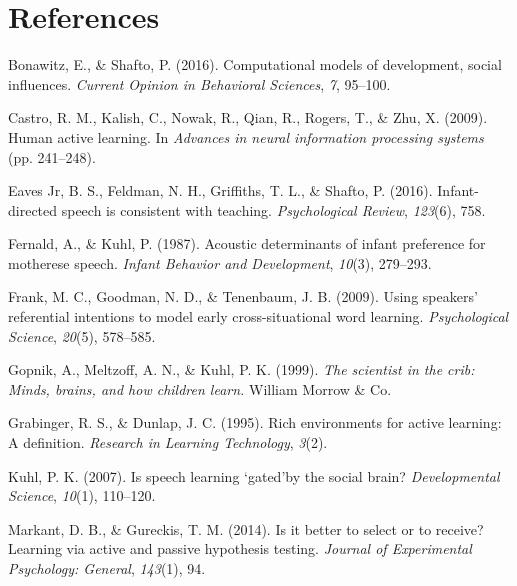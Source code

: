 \documentclass[a4paper,man,apacite,floatsintext]{apa6}
\begin{document}
\newpage

\section{References}\label{references}

\setlength{\parindent}{-0.4in} \setlength{\leftskip}{0.125in} \noindent

\hypertarget{refs}{}
\hypertarget{ref-bonawitz2016computational}{}
Bonawitz, E., \& Shafto, P. (2016). Computational models of development,
social influences. \emph{Current Opinion in Behavioral Sciences},
\emph{7}, 95--100.

\hypertarget{ref-castro2009human}{}
Castro, R. M., Kalish, C., Nowak, R., Qian, R., Rogers, T., \& Zhu, X.
(2009). Human active learning. In \emph{Advances in neural information
processing systems} (pp. 241--248).

\hypertarget{ref-eaves2016infant}{}
Eaves Jr, B. S., Feldman, N. H., Griffiths, T. L., \& Shafto, P. (2016).
Infant-directed speech is consistent with teaching. \emph{Psychological
Review}, \emph{123}(6), 758.

\hypertarget{ref-fernald1987acoustic}{}
Fernald, A., \& Kuhl, P. (1987). Acoustic determinants of infant
preference for motherese speech. \emph{Infant Behavior and Development},
\emph{10}(3), 279--293.

\hypertarget{ref-frank2009using}{}
Frank, M. C., Goodman, N. D., \& Tenenbaum, J. B. (2009). Using
speakers' referential intentions to model early cross-situational word
learning. \emph{Psychological Science}, \emph{20}(5), 578--585.

\hypertarget{ref-gopnik1999scientist}{}
Gopnik, A., Meltzoff, A. N., \& Kuhl, P. K. (1999). \emph{The scientist
in the crib: Minds, brains, and how children learn.} William Morrow \&
Co.

\hypertarget{ref-grabinger1995rich}{}
Grabinger, R. S., \& Dunlap, J. C. (1995). Rich environments for active
learning: A definition. \emph{Research in Learning Technology},
\emph{3}(2).

\hypertarget{ref-kuhl2007speech}{}
Kuhl, P. K. (2007). Is speech learning `gated'by the social brain?
\emph{Developmental Science}, \emph{10}(1), 110--120.

\hypertarget{ref-markant2014better}{}
Markant, D. B., \& Gureckis, T. M. (2014). Is it better to select or to
receive? Learning via active and passive hypothesis testing.
\emph{Journal of Experimental Psychology: General}, \emph{143}(1), 94.
\end{document}
